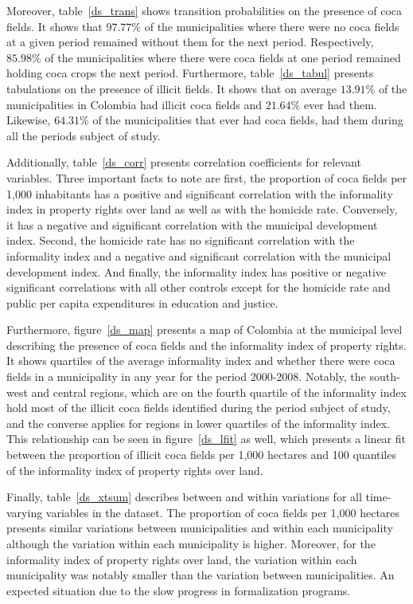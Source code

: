 \documentclass[a4paper, 12pt]{article}
\begin{document}
Moreover, table~\ref{ds_trans} shows transition probabilities on the presence of coca fields. It shows that $97.77\%$ of the municipalities where there were no coca fields at a given period remained without them for the next period. Respectively, $85.98\%$ of the municipalities where there were coca fields at one period remained holding coca crops the next period. Furthermore, table~\ref{ds_tabul} presents tabulations on the presence of illicit  fields. It shows that on average $13.91\%$ of the municipalities in Colombia had illicit coca fields and $21.64\%$ ever had them. Likewise, $64.31\%$ of the municipalities that ever had coca fields, had them during all the periods subject of study.

Additionally, table~\ref{ds_corr} presents correlation coefficients for relevant variables. Three important facts to note are first, the proportion of coca fields per 1,000 inhabitants has a positive and significant correlation with the informality index in property rights over land as well as with the homicide rate. Conversely, it has a negative and significant correlation with the municipal development index. Second, the homicide rate has no significant correlation with the informality index and a negative and significant correlation with the municipal development index. And finally, the informality index has positive or negative significant correlations with all other controls except for the homicide rate and public per capita expenditures in education and justice.

Furthermore, figure~\ref{ds_map} presents a map of Colombia at the municipal level describing the presence of coca fields and the informality index of property rights. It shows quartiles of the average informality index and whether there were coca fields in a municipality in any year for the period 2000-2008. Notably, the south-west and central regions, which are on the fourth quartile of the informality index hold most of the illicit coca fields identified during the period subject of study, and the converse applies for regions in lower quartiles of the informality index. This relationship can be seen in figure~\ref{ds_lfit} as well, which presents a linear fit between the proportion of illicit coca fields per 1,000 hectares and 100 quantiles of the informality index of property rights over land. 

Finally, table~\ref{ds_xtsum} describes between and within variations for all time-varying variables in the dataset. The proportion of coca fields per 1,000 hectares presents similar variations between municipalities and within each municipality although the variation within each municipality is higher. Moreover, for the informality index of property rights over land, the variation within each municipality was notably smaller than the variation between municipalities. An expected situation due to the slow progress in formalization programs.
\end{document}
